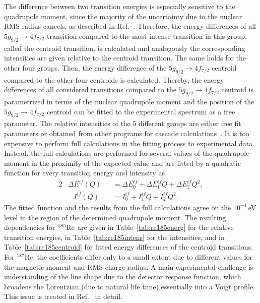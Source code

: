 The difference between two transition energies is especially sensitive to the quadrupole moment, since the majority of the uncertainty due to the nuclear RMS radius cancels, as described in Ref.~\cite{konijn1979}. Therefore, the energy differences of all $5g_{9/2}\rightarrow4f_{7/2}$ transition compared to the most intense transition in this group, called the centroid transition, is calculated and analogously the corresponding intensities are given relative to the centroid transition.
The same holds for the other four groups. Then, the energy difference of the $5g_{9/2}\rightarrow4f_{7/2}$ centroid compared to the other four centroids is calculated.
Thereby, the energy differences of all considered transitions compared to the $5g_{9/2}\rightarrow4f_{7/2}$ centroid is parametrized in terms of the nuclear quadrupole moment and the position of the $5g_{9/2}\rightarrow4f_{7/2}$ centroid can be fitted to the experimental spectrum as a free parameter. The relative intensities of the 5 different groups are either free fit parameters or obtained from other programs for cascade calculations~\cite{elisa_privcomm}.
It is too expensive to perform full calculations in the fitting process to experimental data. Instead, the full calculations are performed for several values of the quadrupole moment in the proximity of the expected value and are fitted by a quadratic function for every transition energy and intensity as
\begin{alignat}{2}
&\Delta E^{if}(Q)&&= \Delta E^{if}_0 +  \Delta E^{if}_1 Q+  \Delta E^{if}_2 Q^2,\label{eq:en_fit}\\
&\phantom{\Delta}I^{if}(Q)&&= I^{if}_0 +  I^{if}_1 Q+  I^{if}_2 Q^2.\label{eq:tran_fit}
\end{alignat}
The fitted function and the results from the full calculations agree on the $10^{-4}\,$eV level in the region of the determined quadrupole moment. The resulting dependencies for $^{185}\rm{Re}$ are given in Table~\ref{tab:re185energ} for the relative transition energies, in Table~\ref{tab:re185intens} for the intensities, and in Table~\ref{tab:re185centroid} for fitted energy differences of the centroid transitions. For $^{187}$Re, the coefficients differ only to a small extent due to different values for the magnetic moment and RMS charge radius.
A main experimental challenge is understanding of the line shape due to the detector response function, which broadens the Lorentzian (due to natural life time) essentially into a Voigt profile. This issue is treated in Ref.~\cite{vogiatzi2018} in detail.

